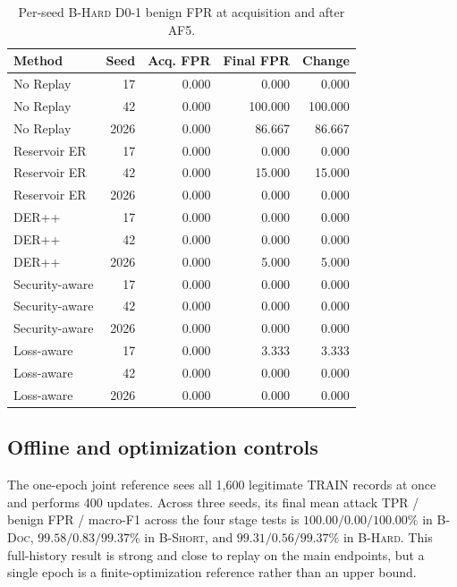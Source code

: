 \documentclass[conference]{IEEEtran}
\newcommand{\bdoc}{\textsc{B-Doc}}
\newcommand{\bshort}{\textsc{B-Short}}
\newcommand{\bhard}{\textsc{B-Hard}}
\newcommand{\af}[1]{\textsc{AF#1}}
\begin{document}
\begin{table}[t]
\caption{Per-seed \bhard{} D0-1 benign FPR at acquisition and after \af{5}.}
\label{tab:d01-seed}

\centering
\scriptsize
\setlength{\tabcolsep}{4pt}
\begin{tabular}{@{}lrrrr@{}}
\toprule
Method & Seed & Acq. FPR & Final FPR & Change \\
\midrule
No Replay & 17 & 0.000 & 0.000 & 0.000 \\
No Replay & 42 & 0.000 & 100.000 & 100.000 \\
No Replay & 2026 & 0.000 & 86.667 & 86.667 \\
Reservoir ER & 17 & 0.000 & 0.000 & 0.000 \\
Reservoir ER & 42 & 0.000 & 15.000 & 15.000 \\
Reservoir ER & 2026 & 0.000 & 0.000 & 0.000 \\
DER++ & 17 & 0.000 & 0.000 & 0.000 \\
DER++ & 42 & 0.000 & 0.000 & 0.000 \\
DER++ & 2026 & 0.000 & 5.000 & 5.000 \\
Security-aware & 17 & 0.000 & 0.000 & 0.000 \\
Security-aware & 42 & 0.000 & 0.000 & 0.000 \\
Security-aware & 2026 & 0.000 & 0.000 & 0.000 \\
Loss-aware & 17 & 0.000 & 3.333 & 3.333 \\
Loss-aware & 42 & 0.000 & 0.000 & 0.000 \\
Loss-aware & 2026 & 0.000 & 0.000 & 0.000 \\
\bottomrule
\end{tabular}


\end{table}

\subsection{Offline and optimization controls}

The one-epoch joint reference sees all 1,600 legitimate TRAIN records at once and performs 400 updates. Across three seeds, its final mean attack TPR / benign FPR / macro-F1 across the four stage tests is $100.00/0.00/100.00\%$ in \bdoc{}, $99.58/0.83/99.37\%$ in \bshort{}, and $99.31/0.56/99.37\%$ in \bhard{}. This full-history result is strong and close to replay on the main endpoints, but a single epoch is a finite-optimization reference rather than an upper bound.
\end{document}
